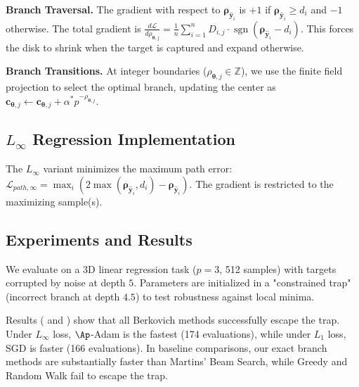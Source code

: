 \textbf{Branch Traversal.} The gradient with respect to $\boldsymbol{\rho}_{\hat{\mathbf{y}}_i}$ is $+1$ if $\boldsymbol{\rho}_{\hat{\mathbf{y}}_i} \ge d_i$ and $-1$ otherwise. The total gradient is $\frac{d \mathcal{L}}{d \rho_{\boldsymbol{\theta}, j}} = \frac{1}{n} \sum_{i=1}^n D_{i,j} \cdot \operatorname{sgn}(\boldsymbol{\rho}_{\hat{\mathbf{y}}_i} - d_i)$. This forces the disk to shrink when the target is captured and expand otherwise.

\textbf{Branch Transitions.} At integer boundaries ($\rho_{\boldsymbol{\theta}, j} \in \mathbb{Z}$), we use the finite field projection to select the optimal branch, updating the center as $\mathbf{c}_{\boldsymbol{\theta}, j} \leftarrow \mathbf{c}_{\boldsymbol{\theta}, j} + \alpha^* p^{-\rho_{\boldsymbol{\theta}, j}}$.

\subsection{\texorpdfstring{$L_\infty$}{Lâ} Regression Implementation}

The $L_\infty$ variant minimizes the maximum path error: $\mathcal{L}_{path,\infty} = \max_{i}(2\max(\boldsymbol{\rho}_{\hat{\mathbf{y}}_i}, d_i) - \boldsymbol{\rho}_{\hat{\mathbf{y}}_i})$. The gradient is restricted to the maximizing sample(s).

\subsection{Experiments and Results}
\label{sec:regression_experiments}

We evaluate on a 3D linear regression task ($p=3$, 512 samples) with targets corrupted by noise at depth $5$. Parameters are initialized in a "constrained trap" (incorrect branch at depth $4.5$) to test robustness against local minima.

Results ( and ) show that all Berkovich methods successfully escape the trap. Under $L_\infty$ loss, $\Ap$-Adam is the fastest (174 evaluations), while under $L_1$ loss, SGD is faster (166 evaluations). In baseline comparisons, our exact branch methods are substantially faster than Martins' Beam Search, while Greedy and Random Walk fail to escape the trap.

